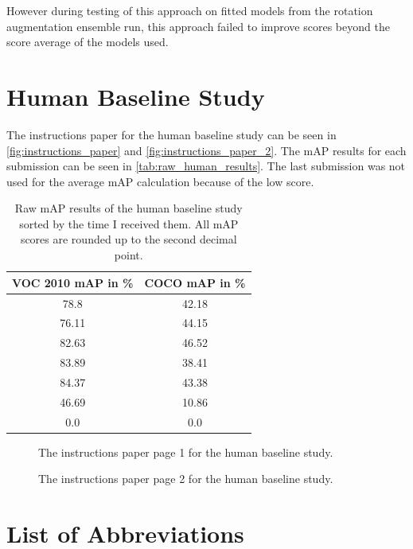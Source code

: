 \documentclass[10pt]{book}
\newcommand{\figureref}[1]{\autoref{#1}}
\begin{document}
However during testing of this approach on fitted models from the rotation augmentation ensemble run, this approach failed to improve scores beyond the score average of the models used.

\section{Human Baseline Study}
\label{sec:instructions_paper}

The instructions paper for the human baseline study can be seen in \figureref{fig:instructions_paper} and \figureref{fig:instructions_paper_2}. The \ac{mAP} results for each submission can be seen in \autoref{tab:raw_human_results}. The last submission was not used for the average \ac{mAP} calculation because of the low score.

\begin{table}
  \begin{tabular}{ c c }
   VOC 2010 \ac{mAP} in \% & \ac{COCO} \ac{mAP} in \% \\ 
   \hline
   78.8 & 42.18 \\
   76.11 & 44.15 \\
   82.63 & 46.52 \\
   83.89 & 38.41 \\
   84.37 & 43.38 \\
   46.69 & 10.86 \\
   0.0 & 0.0 \\
   \hline
  \end{tabular}
  \caption{\label{tab:raw_human_results}Raw \ac{mAP} results of the human baseline study sorted by the time I received them. All \ac{mAP} scores are rounded up to the second decimal point.}
\end{table}

\begin{figure}
  \caption{The instructions paper page 1 for the human baseline study.}
  \label{fig:instructions_paper}
\end{figure}

\begin{figure}
  \caption{The instructions paper page 2 for the human baseline study.}
  \label{fig:instructions_paper_2}
\end{figure}

\section{List of Abbreviations}
\end{document}
